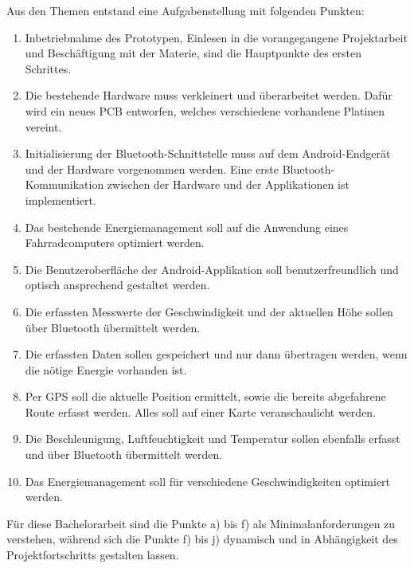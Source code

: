 Aus den Themen entstand eine Aufgabenstellung mit folgenden Punkten:


\begin{enumerate} 

\item Inbetriebnahme des Prototypen, Einlesen in die vorangegangene Projektarbeit und Beschäftigung mit der Materie, sind die Hauptpunkte des ersten Schrittes.

\item Die bestehende Hardware muss verkleinert und überarbeitet werden. Dafür wird ein neues PCB entworfen, welches verschiedene vorhandene Platinen vereint.

\item Initialisierung der Bluetooth-Schnittstelle muss auf dem Android-Endgerät und der Hardware vorgenommen werden. Eine erste Bluetooth-Kommunikation zwischen der Hardware und der Applikationen ist implementiert.

\item Das bestehende Energiemanagement soll auf die Anwendung eines Fahrradcomputers optimiert werden.

\item Die Benutzeroberfläche der Android-Applikation soll benutzerfreundlich und optisch ansprechend gestaltet werden.

\item Die erfassten Messwerte der Geschwindigkeit und der aktuellen Höhe sollen über Bluetooth übermittelt werden.

\item	Die erfassten Daten sollen gespeichert und nur dann übertragen werden, wenn die nötige Energie vorhanden ist.

\item	Per GPS soll die aktuelle Position ermittelt, sowie die bereits abgefahrene Route erfasst werden. Alles soll auf einer Karte veranschaulicht werden.

\item	Die Beschleunigung, Luftfeuchtigkeit und Temperatur sollen ebenfalls erfasst und über Bluetooth übermittelt werden.


\item	Das Energiemanagement soll für verschiedene Geschwindigkeiten optimiert werden.
\end{enumerate}

Für diese Bachelorarbeit sind die Punkte a) bis f) als Minimalanforderungen zu verstehen, während sich die Punkte f) bis j) dynamisch und in Abhängigkeit des Projektfortschritts gestalten lassen.\\

